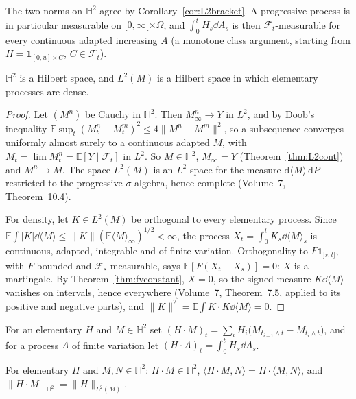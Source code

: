 The two norms on $\mathbb H^2$ agree by Corollary~\ref{cor:L2bracket}. A progressive process is in particular measurable on $[0,\infty[\times\Omega$, and $\int_0^tH_s\dd A_s$ is then $\mathcal F_t$-measurable for every
continuous adapted increasing $A$ (a monotone class argument, starting from $H=\mathbf 1_{[0,u]\times C}$, $C\in\mathcal F_t$).

\begin{lemma}\label{lem:H2complete}
$\mathbb H^2$ is a Hilbert space, and $L^2(M)$ is a Hilbert space in which elementary processes are dense.
\end{lemma}

\begin{proof}
Let $(M^n)$ be Cauchy in $\mathbb H^2$. Then $M^n_\infty\to Y$ in $L^2$, and by Doob's inequality $\mathbb E\sup_t(M^n_t-M^m_t)^2\le4\|M^n-M^m\|^2$, so a subsequence converges uniformly almost surely to a continuous
adapted $M$, with $M_t=\lim M^n_t=\mathbb E[Y\mid\mathcal F_t]$ in $L^2$. So $M\in\mathbb H^2$, $M_\infty=Y$ (Theorem~\ref{thm:L2cont}) and $M^n\to M$. The space $L^2(M)$ is an $L^2$ space for the measure
$\mathrm d\langle M\rangle\,\mathrm dP$ restricted to the progressive $\sigma$-algebra, hence complete (Volume~7, Theorem~10.4).

For density, let $K\in L^2(M)$ be orthogonal to every elementary process. Since $\mathbb E\int|K|\dd\langle M\rangle\le\|K\|(\mathbb E\langle M\rangle_\infty)^{1/2}<\infty$, the process $X_t=\int_0^tK_s\dd\langle M\rangle_s$ is
continuous, adapted, integrable and of finite variation. Orthogonality to $F\mathbf 1_{]s,t]}$, with $F$ bounded and $\mathcal F_s$-measurable, says $\mathbb E[F(X_t-X_s)]=0$: $X$ is a martingale. By
Theorem~\ref{thm:fvconstant}, $X=0$, so the signed measure $K\dd\langle M\rangle$ vanishes on intervals, hence everywhere (Volume~7, Theorem~7.5, applied to its positive and negative parts), and
$\|K\|^2=\mathbb E\int K\cdot K\dd\langle M\rangle=0$.
\end{proof}

For an elementary $H$ and $M\in\mathbb H^2$ set $(H\cdot M)_t=\sum_iH_i\bigl(M_{t_{i+1}\wedge t}-M_{t_i\wedge t}\bigr)$, and for a process $A$ of finite variation let $(H\cdot A)_t=\int_0^tH_s\dd A_s$.

\begin{lemma}\label{lem:elementary}
For elementary $H$ and $M,N\in\mathbb H^2$: $H\cdot M\in\mathbb H^2$, $\langle H\cdot M,N\rangle=H\cdot\langle M,N\rangle$, and $\|H\cdot M\|_{\mathbb H^2}=\|H\|_{L^2(M)}$.
\end{lemma}

